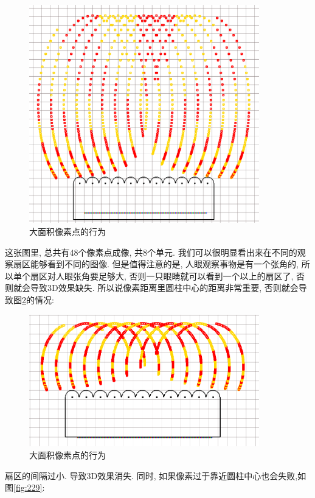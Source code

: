 \documentclass[a4paper, 11pt]{article}
\begin{document}
\begin{CJK}{UTF8}{gbsn}
\begin{figure}
  \centerline{\includegraphics[width=10cm]{225.png}}
  \caption{大面积像素点的行为}
  \label{fig:225}
\end{figure}
这张图里, 总共有48个像素点成像, 共8个单元. 我们可以很明显看出来在不同的观察扇区能够看到不同的图像. 但是值得注意的是, 人眼观察事物是有一个张角的, 所以单个扇区对人眼张角要足够大, 否则一只眼睛就可以看到一个以上的扇区了, 否则就会导致3D效果缺失. 所以说像素距离里圆柱中心的距离非常重要, 否则就会导致图\ref{fig:228}的情况:
\begin{figure}
  \centerline{\includegraphics[width=10cm]{228.png}}
  \caption{大面积像素点的行为}
  \label{fig:228}
\end{figure}
扇区的间隔过小. 导致3D效果消失. 同时, 如果像素过于靠近圆柱中心也会失败,如图\ref{fig:229}:
\begin{figure}

\end{figure}
\end{CJK}
\end{document}
